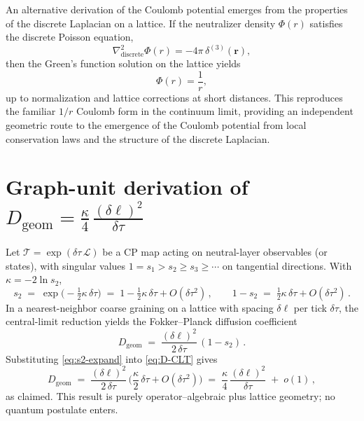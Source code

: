 \documentclass[11pt]{article}
\theoremstyle{plain}
\theoremstyle{definition}
\begin{document}
An alternative derivation of the Coulomb potential emerges from the properties of the discrete Laplacian on a lattice. If the neutralizer density $\Phi(r)$ satisfies the discrete Poisson equation,
\begin{equation}
  \nabla^2_{\text{discrete}} \Phi(r) = -4\pi\,\delta^{(3)}(\mathbf{r}),
\end{equation}
then the Green's function solution on the lattice yields
\begin{equation}
  \Phi(r) = \frac{1}{r},
\end{equation}
up to normalization and lattice corrections at short distances. This reproduces the familiar $1/r$ Coulomb form in the continuum limit, providing an independent geometric route to the emergence of the Coulomb potential from local conservation laws and the structure of the discrete Laplacian.

\section{Graph-unit derivation of \texorpdfstring{$D_{\mathrm{geom}}=\frac{\kappa}{4}\,\frac{(\delta\ell)^2}{\delta\tau}$}{D\_geom = (κ/4)(δℓ)²/δτ}}\label{app:D-derivation-graph}

Let $\mathcal T=\exp(\delta\tau\,\mathcal L)$ be a CP map acting on neutral-layer observables (or states),
with singular values $1=s_1>s_2\ge s_3\ge\cdots$ on tangential directions.
With $\kappa=-2\ln s_2$,
\begin{equation}\label{eq:s2-expand}
  s_2 \;=\; \exp\!\big(-\tfrac12\kappa\,\delta\tau\big)
  \;=\; 1 - \tfrac12\kappa\,\delta\tau + O(\delta\tau^2)\,,
  \qquad 1-s_2 \;=\; \tfrac12\kappa\,\delta\tau + O(\delta\tau^2)\, .
\end{equation}
In a nearest-neighbor coarse graining on a lattice with spacing $\delta\ell$ per tick $\delta\tau$,
the central-limit reduction yields the Fokker–Planck diffusion coefficient
\begin{equation}\label{eq:D-CLT}
  D_{\mathrm{geom}} \;=\; \frac{(\delta\ell)^2}{2\,\delta\tau}\,(1-s_2)\, .
\end{equation}
Substituting \eqref{eq:s2-expand} into \eqref{eq:D-CLT} gives
\begin{equation}
  D_{\mathrm{geom}} \;=\; \frac{(\delta\ell)^2}{2\,\delta\tau}\,\Big(\frac{\kappa}{2}\,\delta\tau + O(\delta\tau^2)\Big)
  \;=\; \frac{\kappa}{4}\,\frac{(\delta\ell)^2}{\delta\tau} \;+\; o(1)\, ,
\end{equation}
as claimed.  This result is purely operator–algebraic plus lattice geometry; no quantum postulate enters.
\end{document}
